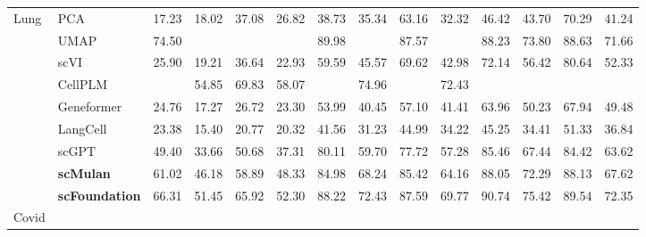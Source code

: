 \begin{table}[htbp]
\begin{tabular}{llcccccccccccc}
    \multirow{9}{*}{Lung}

      & PCA      &   17.23 &   18.02 &   37.08 &   26.82 &   38.73 &   35.34 &   63.16 &   32.32 &   46.42 &   43.70 &   70.29 &   41.24  \\
      & UMAP      &   74.50 & \cellcolor{gray!25}{58.40} & \cellcolor{gray!25}{74.51} & \cellcolor{gray!25}{62.42} &   89.98 & \cellcolor{gray!25}{76.39} &   87.57 & \cellcolor{gray!25}{73.48} &   88.23 &   73.80 &   88.63 &   71.66  \\
      & scVI      &   25.90 &   19.21 &   36.64 &   22.93 &   59.59 &   45.57 &   69.62 &   42.98 &   72.14 &   56.42 &   80.64 &   52.33  \\
      & CellPLM      & \cellcolor{gray!25}{77.11} &   54.85 &   69.83 &   58.07 & \cellcolor{gray!25}{91.39} &   74.96 & \cellcolor{gray!25}{87.76} &   72.43 & \cellcolor{gray!25}{91.55} & \cellcolor{gray!25}{76.04} & \cellcolor{gray!25}{89.75} & \cellcolor{gray!25}{72.91}  \\
      & Geneformer      &   24.76 &   17.27 &   26.72 &   23.30 &   53.99 &   40.45 &   57.10 &   41.41 &   63.96 &   50.23 &   67.94 &   49.48  \\
      & LangCell      &   23.38 &   15.40 &   20.77 &   20.32 &   41.56 &   31.23 &   44.99 &   34.22 &   45.25 &   34.41 &   51.33 &   36.84  \\
      & scGPT      &   49.40 &   33.66 &   50.68 &   37.31 &   80.11 &   59.70 &   77.72 &   57.28 &   85.46 &   67.44 &   84.42 &   63.62  \\
      & \cellcolor{gray!25}\textbf{scMulan}      &   61.02 &   46.18 &   58.89 &   48.33 &   84.98 &   68.24 &   85.42 &   64.16 &   88.05 &   72.29 &   88.13 &   67.62  \\
      & \cellcolor{gray!25}\textbf{scFoundation}      &   66.31 &   51.45 &   65.92 &   52.30 &   88.22 &   72.43 &   87.59 &   69.77 &   90.74 &   75.42 &   89.54 &   72.35  \\
    \midrule

    \multirow{9}{*}{Covid}


\end{tabular}
\end{table}
